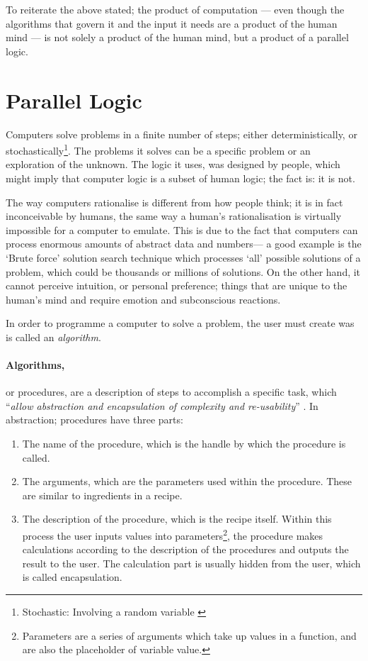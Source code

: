 To reiterate the above stated; the product of computation --- even though the algorithms that govern it and the input it needs are a product of the human mind --- is not solely a product of the human mind, but a product of a parallel logic.

\section{Parallel Logic}

\label{ParallelLogic}
Computers solve problems in a finite number of steps; either deterministically, or stochastically\footnote{Stochastic: Involving a random variable \cite{merriam03}}. The problems it solves can be a specific problem or an exploration of the unknown. The logic it uses, was designed by people, which might imply that computer logic is a subset of human logic; the fact is: it is not.

The way computers rationalise is different from how people think; it is in fact inconceivable by humans, the same way a human's rationalisation is virtually impossible for a computer to emulate.  This is due to the fact that computers can process enormous amounts of abstract data and numbers--- a good example is the `Brute force' solution search technique which processes `all' possible solutions of a problem, which could be thousands or millions of solutions. On the other hand, it cannot perceive intuition, or personal preference; things that are unique to the human's mind and require emotion and subconscious reactions.

In order to programme a computer to solve a problem, the user must create was is called an \emph{algorithm}.

\paragraph{Algorithms,}or procedures, are a description of steps to accomplish a specific task, which ``\emph{allow abstraction and encapsulation of complexity and re-usability}'' \cite{hernandez06}. In abstraction; procedures have three parts:
\begin{enumerate}
  \item The name of the procedure, which is the handle by which the procedure is called.
  \item The arguments, which are the parameters used within the procedure. These are similar to ingredients in a recipe.
  \item The description of the procedure, which is the recipe itself. Within this process the user inputs values into parameters\footnote{Parameters are a series of arguments which take up values in a function, and are also the placeholder of variable value.}, the procedure makes calculations according to the description of the procedures and outputs the result to the user. The calculation part is usually hidden from the user, which is called encapsulation.
\end{enumerate}

